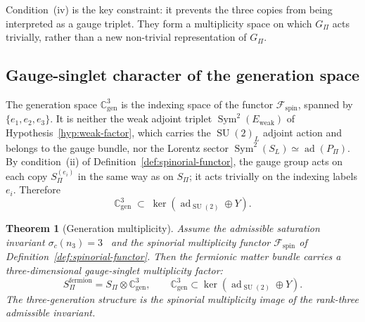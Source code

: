 \documentclass[11pt,a4paper]{article}
\newtheorem{theorem}{Theorem}[section]
\theoremstyle{definition}
\theoremstyle{remark}
\newcommand{\SU}{\operatorname{SU}}
\begin{document}
    Condition~(iv) is the key constraint: it prevents the three copies from being
    interpreted as a gauge triplet.
    They form a multiplicity space on which $G_\Pi$ acts trivially, rather than a
    new non-trivial representation of $G_\Pi$.

  \subsection{Gauge-singlet character of the generation space}
    \label{ssec:gauge-singlet-generation}

    The generation space $\mathbb{C}^3_{\mathrm{gen}}$ is the indexing space of the
    functor $\mathcal{F}_{\mathrm{spin}}$, spanned by $\{e_1, e_2, e_3\}$.
    It is neither the weak adjoint triplet $\operatorname{Sym}^2(E_{\mathrm{weak}})$ of
    Hypothesis~\ref{hyp:weak-factor}, which carries the $\SU(2)_L$ adjoint action and belongs to the gauge
    bundle, nor the Lorentz sector $\operatorname{Sym}^2(S_L) \simeq \operatorname{ad}(P_\Pi)$.
    By condition~(ii) of Definition~\ref{def:spinorial-functor}, the gauge group acts
    on each copy $S_\Pi^{(e_i)}$ in the same way as on $S_\Pi$; it acts trivially on
    the indexing labels $e_i$.
    Therefore
    \begin{equation}
      \label{eq:generation-singlet}
      \mathbb{C}^3_{\mathrm{gen}}
      \;\subset\;
      \ker\!\left(\operatorname{ad}_{\SU(2)} \oplus Y\right).
    \end{equation}

    \begin{theorem}[Generation multiplicity]
      \label{thm:generation-multiplicity}
      Assume the admissible saturation invariant $\sigma_c(n_3) = 3$~\cite{Beau2026a27}
      and the spinorial multiplicity functor $\mathcal{F}_{\mathrm{spin}}$ of
      Definition~\ref{def:spinorial-functor}.
      Then the fermionic matter bundle carries a three-dimensional gauge-singlet
      multiplicity factor:
      \begin{equation}
        \label{eq:fermionic-matter}
        S_\Pi^{\mathrm{fermion}}
        = S_\Pi \otimes \mathbb{C}^3_{\mathrm{gen}},
        \qquad
        \mathbb{C}^3_{\mathrm{gen}}
        \subset
        \ker\!\left(\operatorname{ad}_{\SU(2)} \oplus Y\right).
      \end{equation}
      The three-generation structure is the spinorial multiplicity image of the
      rank-three admissible invariant.
    \end{theorem}
\end{document}
